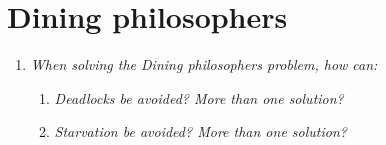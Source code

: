 \documentclass[a4paper]{article}
\begin{document}
\section{Dining philosophers}
\begin{enumerate}
  \item \textit{When solving the Dining philosophers problem, how can:} \\
    \begin{enumerate}
      \item \textit{Deadlocks be avoided? More than one solution?} \\
      \item \textit{Starvation be avoided? More than one solution?} \\
    \end{enumerate}
\end{enumerate}
\end{document}
